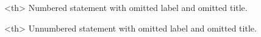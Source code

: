\documentclass{article}
\begin{document}
\begin{statementsp}<th>
Numbered statement with omitted label and omitted title.
\end{statementsp}
\begin{statementsp*}<th>
Unnumbered statement with omitted label and omitted title.
\end{statementsp*}
\end{document}

